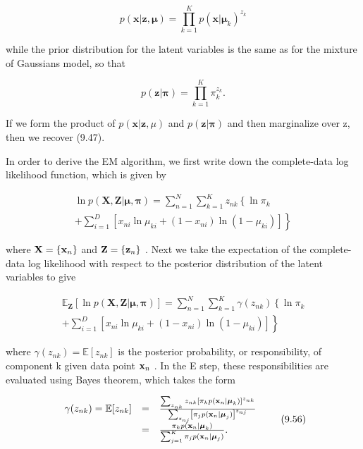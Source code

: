 \documentclass[
  10
]{article}
\begin{document}
\[
p (\mathbf {x} | \mathbf {z}, \boldsymbol {\mu}) = \prod_ {k = 1} ^ {K} p (\mathbf {x} | \boldsymbol {\mu} _ {k}) ^ {z _ {k}}\tag{9.52}
\]

while the prior distribution for the latent variables is the same as for
the mixture of Gaussians model, so that

\[
p (\mathbf {z} | \boldsymbol {\pi}) = \prod_ {k = 1} ^ {K} \pi_ {k} ^ {z _ {k}}.\tag{9.53}
\]

If we form the product of \(p ( \mathbf { x } | \mathbf { z } , \mu )\)
and \(p ( \mathbf { z } | \boldsymbol { \pi } )\) and then marginalize
over z, then we recover (9.47).

In order to derive the EM algorithm, we first write down the
complete-data log likelihood function, which is given by

\[
\begin{array}{l} \ln p (\mathbf {X}, \mathbf {Z} | \boldsymbol {\mu}, \boldsymbol {\pi}) = \sum_ {n = 1} ^ {N} \sum_ {k = 1} ^ {K} z _ {n k} \left\{\ln \pi_ {k} \right. \\ \left. + \sum_ {i = 1} ^ {D} [ x _ {n i} \ln \mu_ {k i} + (1 - x _ {n i}) \ln (1 - \mu_ {k i}) ] \right\} \end{array}\tag{9.54}
\]

where \({ \bf X } = \{ { \bf x } _ { n } \}\) and
\({ \bf Z } = \{ { \bf z } _ { n } \}\) . Next we take the expectation
of the complete-data log likelihood with respect to the posterior
distribution of the latent variables to give

\[
\begin{array}{l} \mathbb {E} _ {\mathbf {Z}} [ \ln p (\mathbf {X}, \mathbf {Z} | \boldsymbol {\mu}, \boldsymbol {\pi}) ] = \sum_ {n = 1} ^ {N} \sum_ {k = 1} ^ {K} \gamma (z _ {n k}) \left\{\ln \pi_ {k} \right. \\ \left. + \sum_ {i = 1} ^ {D} \left[ x _ {n i} \ln \mu_ {k i} + (1 - x _ {n i}) \ln (1 - \mu_ {k i}) \right] \right\} \end{array}\tag{9.55}
\]

where \(\gamma ( z _ { n k } ) = \mathbb { E } [ z _ { n k } ]\) is the
posterior probability, or responsibility, of component k given data
point \({ \bf x } _ { n }\) . In the E step, these responsibilities are
evaluated using Bayes theorem, which takes the form

\[
\begin{array}{l l l} \gamma (z _ {n k}) = \mathbb {E} [ z _ {n k} ] & = & \frac {\sum_ {z _ {n k}} z _ {n k} \left[ \pi_ {k} p (\mathbf {x} _ {n} | \boldsymbol {\mu} _ {k}) \right] ^ {z _ {n k}}}{\sum_ {z _ {n j}} \left[ \pi_ {j} p (\mathbf {x} _ {n} | \boldsymbol {\mu} _ {j}) \right] ^ {z _ {n j}}} \\ & = & \frac {\pi_ {k} p (\mathbf {x} _ {n} | \boldsymbol {\mu} _ {k})}{\sum_ {j = 1} ^ {K} \pi_ {j} p (\mathbf {x} _ {n} | \boldsymbol {\mu} _ {j})}. \end{array}\tag{9.56}
\]
\end{document}
